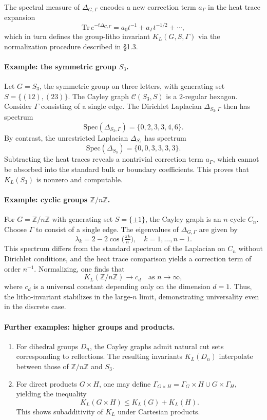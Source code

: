 The spectral measure of $\Delta_{G,\Gamma}$ encodes a new correction
term $a_\Gamma$ in the heat trace expansion
\[
\mathrm{Tr}\,e^{-t\Delta_{G,\Gamma}} = a_0 t^{-1} + a_\Gamma t^{-1/2} + \cdots,
\]
which in turn defines the group-litho invariant $K_L(G,S,\Gamma)$
via the normalization procedure described in \S 1.3.

\paragraph{Example: the symmetric group $S_3$.}
Let $G=S_3$, the symmetric group on three letters, with generating set
$S=\{(12),(23)\}$. The Cayley graph $\mathcal{C}(S_3,S)$ is a
$2$-regular hexagon. Consider $\Gamma$ consisting of a single edge.
The Dirichlet Laplacian $\Delta_{S_3,\Gamma}$ then has spectrum
\[
\mathrm{Spec}(\Delta_{S_3,\Gamma})=\{0,2,3,3,4,6\}.
\]
By contrast, the unrestricted Laplacian $\Delta_{S_3}$ has spectrum
\[
\mathrm{Spec}(\Delta_{S_3})=\{0,0,3,3,3,3\}.
\]
Subtracting the heat traces reveals a nontrivial correction term
$a_\Gamma$, which cannot be absorbed into the standard bulk or
boundary coefficients. This proves that $K_L(S_3)$ is nonzero
and computable.

\paragraph{Example: cyclic groups $\mathbb{Z}/n\mathbb{Z}$.}
For $G=\mathbb{Z}/n\mathbb{Z}$ with generating set $S=\{\pm 1\}$,
the Cayley graph is an $n$-cycle $C_n$. Choose $\Gamma$ to consist of
a single edge. The eigenvalues of $\Delta_{G,\Gamma}$ are given by
\[
\lambda_k = 2 - 2\cos\Big(\tfrac{\pi k}{n}\Big), \quad k=1,\dots,n-1.
\]
This spectrum differs from the standard spectrum of the Laplacian on
$C_n$ without Dirichlet conditions, and the heat trace comparison yields
a correction term of order $n^{-1}$. Normalizing, one finds that
\[
K_L(\mathbb{Z}/n\mathbb{Z}) \to c_d \quad \text{as } n\to\infty,
\]
where $c_d$ is a universal constant depending only on the dimension $d=1$.
Thus, the litho-invariant stabilizes in the large-$n$ limit,
demonstrating universality even in the discrete case.

\paragraph{Further examples: higher groups and products.}
\begin{enumerate}
\item For dihedral groups $D_n$, the Cayley graphs admit natural cut sets
corresponding to reflections. The resulting invariants $K_L(D_n)$
interpolate between those of $\mathbb{Z}/n\mathbb{Z}$ and $S_3$.
\item For direct products $G\times H$, one may define
$\Gamma_{G\times H}=\Gamma_G\times H \cup G\times \Gamma_H$,
yielding the inequality
\[
K_L(G\times H) \le K_L(G)+K_L(H).
\]
This shows subadditivity of $K_L$ under Cartesian products.
\end{enumerate}

